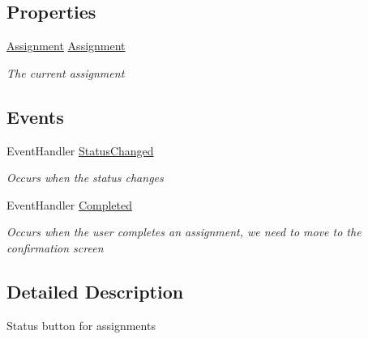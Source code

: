 \subsection*{Properties}
\begin{DoxyCompactItemize}
\item 
\hyperlink{class_field_service_1_1_data_1_1_assignment}{Assignment} \hyperlink{class_field_service_1_1i_o_s_1_1_status_button_a8e5651c1c4924cd4c9619d5858c68d19}{Assignment}
\begin{DoxyCompactList}\small\item\em The current assignment \end{DoxyCompactList}\end{DoxyCompactItemize}
\subsection*{Events}
\begin{DoxyCompactItemize}
\item 
Event\+Handler \hyperlink{class_field_service_1_1i_o_s_1_1_status_button_a302529aba6fca58f3b31dda51473d4e5}{Status\+Changed}
\begin{DoxyCompactList}\small\item\em Occurs when the status changes \end{DoxyCompactList}\item 
Event\+Handler \hyperlink{class_field_service_1_1i_o_s_1_1_status_button_aa27388d45ad1067646def41236725af5}{Completed}
\begin{DoxyCompactList}\small\item\em Occurs when the user completes an assignment, we need to move to the confirmation screen \end{DoxyCompactList}\end{DoxyCompactItemize}


\subsection{Detailed Description}
Status button for assignments 



